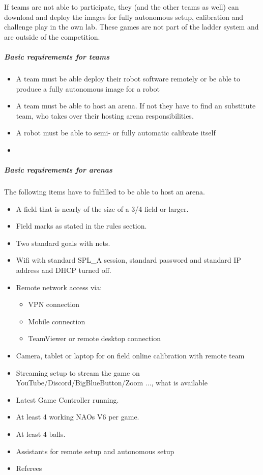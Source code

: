 If teams are not able to participate, they (and the other teams as well) can download and deploy the images for fully autonomous setup, calibration and challenge play in the own lab. These games are not part of the ladder system and are outside of the competition.

\subparagraph*{Basic requirements for teams}

\begin{itemize}
    \item A team must be able deploy their robot software remotely or be able to produce a fully autonomous image for a robot
    \item A team must be able to host an arena. If not they have to find an substitute team, who takes over their hosting arena responsibilities.
    \item A robot must be able to semi- or fully automatic calibrate itself
    \item 
\end{itemize}

\subparagraph*{Basic requirements for arenas}

The following items have to fulfilled to be able to host an arena.

\begin{itemize}
    \item A field that is nearly of the size of a 3/4 field or larger.
    \item Field marks as stated in the rules section. 
    \item Two standard goals with nets.
    \item Wifi with standard SPL_A session, standard password and standard IP address and DHCP turned off.
    \item Remote network access via:
    \begin{itemize}
        \item VPN connection
        \item Mobile connection
        \item TeamViewer or remote desktop connection
    \end{itemize}
    \item Camera, tablet or laptop for on field online calibration with remote team
    \item Streaming setup to stream the game on YouTube/Discord/BigBlueButton/Zoom ..., what is available
    \item Latest Game Controller running.
    \item At least 4 working NAOs V6 per game.
    \item At least 4 balls.
    \item Assistants for remote setup and autonomous setup
    \item Referees
\end{itemize}


